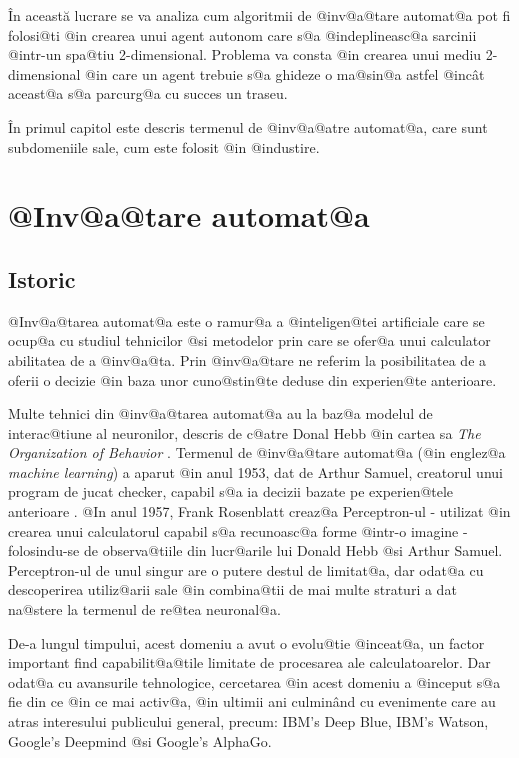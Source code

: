 \^ In aceast\u a lucrare se va analiza cum algoritmii de @inv@a@tare automat@a  pot fi folosi@ti @in crearea unui agent autonom care s@a @indeplineasc@a sarcinii @intr-un spa@tiu 2-dimensional. Problema va consta @in crearea unui mediu 2-dimensional @in care un agent trebuie s@a ghideze o ma@sin@a astfel @inc\^ at aceast@a s@a parcurg@a cu succes un traseu.
\hspace{0.2cm}

\^ In primul capitol este descris termenul de @inv@a@atre automat@a, care sunt subdomeniile sale, cum este folosit @in @industire. 

\newpage

\chapter{ @Inv@a@tare automat@a }

\section{Istoric}

	@Inv@a@tarea automat@a este o ramur@a a @inteligen@tei artificiale care se ocup@a cu studiul tehnicilor @si metodelor prin care se ofer@a unui calculator abilitatea de a @inv@a@ta. Prin @inv@a@tare ne referim la posibilitatea de a oferii o decizie @in baza unor cuno@stin@te deduse din experien@te anterioare.

 Multe tehnici din @inv@a@tarea automat@a au la baz@a modelul de interac@tiune al neuronilor, descris de c@atre Donal Hebb @in cartea sa {\sl The Organization of Behavior} \cite{donald-hebb-book}. Termenul de @inv@a@tare automat@a (@in englez@a {\sl machine learning}) a aparut @in anul 1953, dat de Arthur Samuel, creatorul unui program de jucat checker, capabil s@a ia decizii bazate pe experien@tele anterioare \cite{arthur-samuel}. @In anul 1957, Frank Rosenblatt creaz@a Perceptron-ul - utilizat @in crearea unui calculatorul capabil s@a recunoasc@a forme @intr-o imagine - folosindu-se de observa@tiile din lucr@arile lui Donald Hebb @si Arthur Samuel. Perceptron-ul de unul singur are o putere destul de limitat@a, dar odat@a cu descoperirea utiliz@arii sale @in combina@tii de mai multe straturi a dat na@stere la termenul de re@tea neuronal@a. 
 
 De-a lungul timpului, acest domeniu a avut o evolu@tie @inceat@a, un factor important find capabilit@a@tile limitate de procesarea ale calculatoarelor. Dar odat@a cu avansurile tehnologice, cercetarea @in acest domeniu a @inceput s@a fie din ce @in ce mai activ@a, @in ultimii ani culmin\^ and cu evenimente care au atras interesului publicului general, precum: IBM's Deep Blue, IBM's Watson, Google's Deepmind @si Google's AlphaGo.
 
